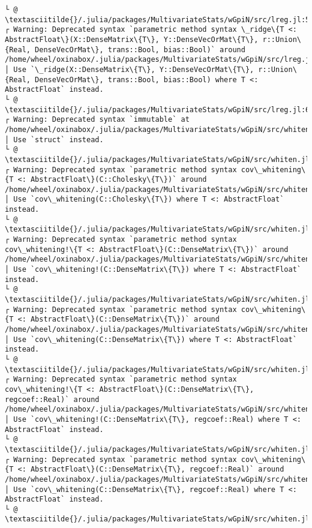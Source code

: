 \documentclass[11pt]{article}
\begin{document}
\begin{Verbatim}[commandchars=\\\{\}]
└ @ \textasciitilde{}/.julia/packages/MultivariateStats/wGpiN/src/lreg.jl:54
┌ Warning: Deprecated syntax `parametric method syntax \_ridge\{T <: AbstractFloat\}(X::DenseMatrix\{T\}, Y::DenseVecOrMat\{T\}, r::Union\{Real, DenseVecOrMat\}, trans::Bool, bias::Bool)` around /home/wheel/oxinabox/.julia/packages/MultivariateStats/wGpiN/src/lreg.jl:63.
│ Use `\_ridge(X::DenseMatrix\{T\}, Y::DenseVecOrMat\{T\}, r::Union\{Real, DenseVecOrMat\}, trans::Bool, bias::Bool) where T <: AbstractFloat` instead.
└ @ \textasciitilde{}/.julia/packages/MultivariateStats/wGpiN/src/lreg.jl:63
┌ Warning: Deprecated syntax `immutable` at /home/wheel/oxinabox/.julia/packages/MultivariateStats/wGpiN/src/whiten.jl:24.
│ Use `struct` instead.
└ @ \textasciitilde{}/.julia/packages/MultivariateStats/wGpiN/src/whiten.jl:24
┌ Warning: Deprecated syntax `parametric method syntax cov\_whitening\{T <: AbstractFloat\}(C::Cholesky\{T\})` around /home/wheel/oxinabox/.julia/packages/MultivariateStats/wGpiN/src/whiten.jl:8.
│ Use `cov\_whitening(C::Cholesky\{T\}) where T <: AbstractFloat` instead.
└ @ \textasciitilde{}/.julia/packages/MultivariateStats/wGpiN/src/whiten.jl:8
┌ Warning: Deprecated syntax `parametric method syntax cov\_whitening!\{T <: AbstractFloat\}(C::DenseMatrix\{T\})` around /home/wheel/oxinabox/.julia/packages/MultivariateStats/wGpiN/src/whiten.jl:12.
│ Use `cov\_whitening!(C::DenseMatrix\{T\}) where T <: AbstractFloat` instead.
└ @ \textasciitilde{}/.julia/packages/MultivariateStats/wGpiN/src/whiten.jl:12
┌ Warning: Deprecated syntax `parametric method syntax cov\_whitening\{T <: AbstractFloat\}(C::DenseMatrix\{T\})` around /home/wheel/oxinabox/.julia/packages/MultivariateStats/wGpiN/src/whiten.jl:13.
│ Use `cov\_whitening(C::DenseMatrix\{T\}) where T <: AbstractFloat` instead.
└ @ \textasciitilde{}/.julia/packages/MultivariateStats/wGpiN/src/whiten.jl:13
┌ Warning: Deprecated syntax `parametric method syntax cov\_whitening!\{T <: AbstractFloat\}(C::DenseMatrix\{T\}, regcoef::Real)` around /home/wheel/oxinabox/.julia/packages/MultivariateStats/wGpiN/src/whiten.jl:15.
│ Use `cov\_whitening!(C::DenseMatrix\{T\}, regcoef::Real) where T <: AbstractFloat` instead.
└ @ \textasciitilde{}/.julia/packages/MultivariateStats/wGpiN/src/whiten.jl:15
┌ Warning: Deprecated syntax `parametric method syntax cov\_whitening\{T <: AbstractFloat\}(C::DenseMatrix\{T\}, regcoef::Real)` around /home/wheel/oxinabox/.julia/packages/MultivariateStats/wGpiN/src/whiten.jl:18.
│ Use `cov\_whitening(C::DenseMatrix\{T\}, regcoef::Real) where T <: AbstractFloat` instead.
└ @ \textasciitilde{}/.julia/packages/MultivariateStats/wGpiN/src/whiten.jl:18

\end{Verbatim}
\end{document}
